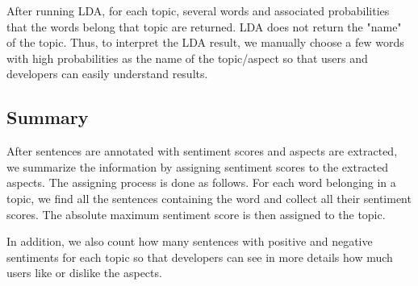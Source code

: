 After running LDA, for each topic, several words and associated probabilities that the words belong that topic are returned. LDA does not return the "name" of the topic. Thus, to interpret the LDA result, we manually choose a few words with high probabilities as the name of the topic/aspect so that users and developers can easily understand results.

\subsection{Summary}
\label{Summary}
After sentences are annotated with sentiment scores and aspects are extracted, we summarize the information by assigning sentiment scores to the extracted aspects. The assigning process is done as follows. For each word belonging in a topic, we find all the sentences containing the word and collect all their sentiment scores. The absolute maximum sentiment score is then assigned to the topic.

In addition, we also count how many sentences with positive and negative sentiments for each topic so that developers can see in more details how much users like or dislike the aspects. 


